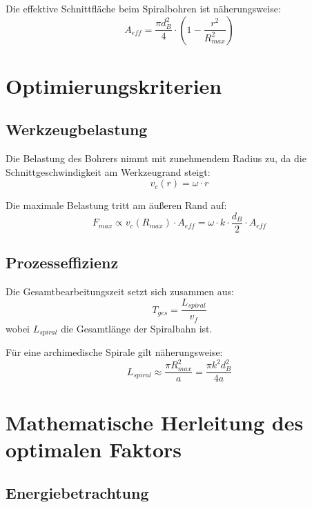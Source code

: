 ﻿\documentclass[12pt,a4paper]{article}
\begin{document}
Die effektive Schnittfläche beim Spiralbohren ist näherungsweise:
\begin{equation}
	A_{eff} = \frac{\pi d_B^2}{4} \cdot \left(1 - \frac{r^2}{R_{max}^2}\right)
\end{equation}

\section{Optimierungskriterien}

\subsection{Werkzeugbelastung}

Die Belastung des Bohrers nimmt mit zunehmendem Radius zu, da die Schnittgeschwindigkeit am Werkzeugrand steigt:
\begin{equation}
	v_c(r) = \omega \cdot r
\end{equation}

Die maximale Belastung tritt am äußeren Rand auf:
\begin{equation}
	F_{max} \propto v_c(R_{max}) \cdot A_{eff} = \omega \cdot k \cdot \frac{d_B}{2} \cdot A_{eff}
\end{equation}

\subsection{Prozesseffizienz}

Die Gesamtbearbeitungszeit setzt sich zusammen aus:
\begin{equation}
	T_{ges} = \frac{L_{spiral}}{v_f}
\end{equation}
wobei $L_{spiral}$ die Gesamtlänge der Spiralbahn ist.

Für eine archimedische Spirale gilt näherungsweise:
\begin{equation}
	L_{spiral} \approx \frac{\pi R_{max}^2}{a} = \frac{\pi k^2 d_B^2}{4a}
\end{equation}

\section{Mathematische Herleitung des optimalen Faktors}

\subsection{Energiebetrachtung}
\end{document}
